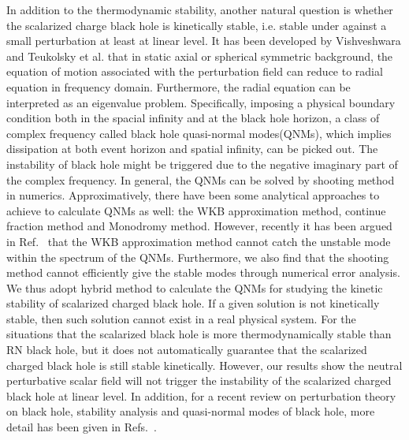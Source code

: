 \documentclass[pr, twocolumn, preprintnumbers, showpacs,footnoteadded, superscriptaddress,nofootinbib,longbibliography]{revtex4-1}
\begin{document}
In addition to the thermodynamic stability, another natural question is whether the scalarized charge black hole is kinetically stable, i.e. stable under against a small perturbation at least at linear level. It has been developed by Vishveshwara and Teukolsky et al.\cite{Teukolsky:1973ha,Press:1973zz,Vishveshwara:1970cc} that in static axial or spherical symmetric background, the equation of motion associated with the perturbation field can reduce to radial equation in frequency domain. Furthermore, the radial equation can be interpreted as an eigenvalue problem. Specifically, imposing a physical boundary condition both in the spacial infinity and at the black hole horizon, a class of complex frequency called black hole quasi-normal modes(QNMs), which implies dissipation at both event horizon and spatial infinity, can be picked out. The instability of black hole might be triggered due to the negative imaginary part of the complex frequency. In general, the QNMs can be solved by shooting method in numerics. Approximatively, there have been some analytical approaches to achieve to calculate QNMs as well: the WKB approximation method, continue fraction method and Monodromy method. However, recently it has been argued in Ref.~\cite{Konoplya:2019hlu} that the WKB approximation method cannot catch the unstable mode within the spectrum of the QNMs. Furthermore, we also find that the shooting method cannot efficiently give the stable modes through numerical error analysis. We thus adopt hybrid method to calculate the QNMs for studying the kinetic stability of scalarized charged black hole. If a given solution is not kinetically stable, then such solution cannot exist in a real physical system. For the situations that the scalarized black hole is more thermodynamically stable than RN black hole, but it does not automatically guarantee that the scalarized charged black hole is still stable kinetically. However, our results show the neutral perturbative scalar field will not trigger the instability of the scalarized charged black hole at linear level. In addition, for a recent review on perturbation theory on black hole, stability analysis and quasi-normal modes of black hole, more detail has been given in Refs.~\cite{Pani:2013pma, Konoplya:2011qq, Berti:2009kk}.
\end{document}

